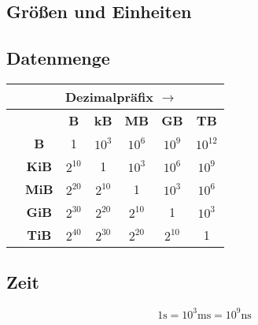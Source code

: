 \documentclass[a4paper, landscape]{article}
\title{\name}
\author{Louis Seubert}
\begin{document}
    \begin{multicols}{3}
        
        
        \section{Größen und Einheiten}
        
        \subsection{Datenmenge}
        \begin{center}
            \begin{tabular}{|c|c|c|c|c|c|c|}
                \hline \rule{0pt}{3ex} & \multicolumn{6}{c|}{Dezimalpräfix $\longrightarrow$}\\
                \hline \rule{0pt}{3ex}
                \multirow{6}{*}{\rotatebox[origin=center]{90}{$\longleftarrow$ Binärpräfix}} && \textbf{B} & \textbf{kB} & \textbf{MB} & \textbf{GB} & \textbf{TB} \\
                \cline{2-7}\rule{0pt}{3ex} & \textbf{B} & 1 & $10^{3}$ & $10^{6}$ & $10^{9}$ & $10^{12}$ \\
                \cline{2-7}\rule{0pt}{3ex} & \textbf{KiB} & $2^{10}$ & 1 & $10^{3}$ & $10^{6}$ & $10^{9}$ \\
                \cline{2-7}\rule{0pt}{3ex} & \textbf{MiB} & $2^{20}$ & $2^{10}$ & 1 & $10^{3}$ & $10^{6}$ \\
                \cline{2-7}\rule{0pt}{3ex} & \textbf{GiB} & $2^{30}$ & $2^{20}$ & $2^{10}$ & 1 & $10^{3}$ \\
                \cline{2-7}\rule{0pt}{3ex} & \textbf{TiB} & $2^{40}$ & $2^{30}$ & $2^{20}$ & $2^{10}$ & 1 \\
                \hline
            \end{tabular}
        \end{center}
        
        \subsection{Zeit}
        \[
        1\text{s} = 10^3\text{ms} = 10^9\text{ns}
        \]
        

\end{multicols}
\end{document}
